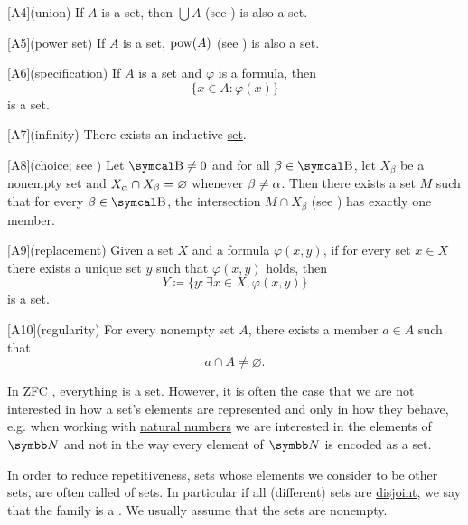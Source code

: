 \begin{definition}
\begin{description}
    [A4](union) If \( A \) is a set, then \( \bigcup A \) (see ) is also a set.

    [A5](power set) If \( A \) is a set, \( \operatorname{pow}(A) \) (see ) is also a set.

    [A6](specification) If \( A \) is a set and \( \varphi \) is a formula, then
    \begin{equation*}
      \{ x \in A \colon \varphi(x) \}
    \end{equation*}
    is a set.

    [A7](infinity) There exists an inductive \hyperref[def:inductive_set]{set}.

    [A8](choice; see ) Let \( \CB \neq 0 \) and for all \( \beta \in \CB \), let \( X_\beta \) be a nonempty set and \( X_\alpha \cap X_\beta = \varnothing \) whenever \( \beta \neq \alpha \). Then there exists a set \( M \) such that for every \( \beta \in \CB \), the intersection \( M \cap X_\beta \) (see ) has exactly one member.

    [A9](replacement) Given a set \( X \) and a formula \( \varphi(x, y) \), if for every set \( x \in X \) there exists a unique set \( y \) such that \( \varphi(x, y) \) holds, then
    \begin{equation*}
      Y \coloneqq \{ y \colon \exists x \in X, \varphi(x, y) \}
    \end{equation*}
    is a set.

    [A10](regularity) For every nonempty set \( A \), there exists a member \( a \in A \) such that
    \begin{equation*}
      a \cap A \neq \varnothing.
    \end{equation*}
  \end{description}
\end{definition}

\begin{remark}\label{remark:family_of_sets}
  In ZFC , everything is a set. However, it is often the case that we are not interested in how a set's elements are represented and only in how they behave, e.g. when working with \hyperref[def:natural_numbers]{natural numbers} we are interested in the elements of \( \BN \) and not in the way every element of \( \BN \) is encoded as a set.

  In order to reduce repetitiveness, sets whose elements we consider to be other sets, are often called  of sets. In particular if all (different) sets are \hyperref[def:set_intersection]{disjoint}, we say that the family is a . We usually assume that the sets are nonempty.
\end{remark}


